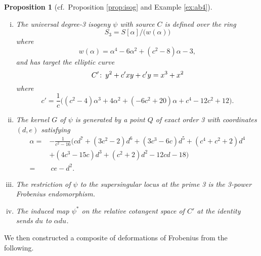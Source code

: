 \documentclass{gtpart}
\newtheorem{prop}[thm]{Proposition}
\theoremstyle{definition}
\theoremstyle{remark}
\def\co{\colon\thinspace}
\newcommand{\A}{\alpha}
\numberwithin{equation}{section}
\numberwithin{thm}{section}
\begin{document}
\begin{prop}[cf.~Proposition \ref{prop:isog} and Example \ref{ex:ab4}]
\label{prop:df}
 \mbox{}
 \begin{enumerate}[(i)]
  \item \label{df(i)} The universal degree-3 isogeny $\psi$ with source 
  $C$ is defined over the ring 
  \begin{equation}
  \label{S3}
   S_3 = S [\A] \big/ \big( w(\A) \big) 
  \end{equation}
  where 
  \[
   w(\A) = \A^4 - 6 \A^2 + (c^2 - 8) \A - 3, 
  \]
  and has target the elliptic curve 
  \begin{equation}
  \label{C'}
   C' \co y^2 + c' x y + c' y = x^3 + x^2 
  \end{equation}
  where 
  \[
   c' = \frac{1}{c} \big( (c^2 - 4) \A^3 + 4 \A^2 + (-6 c^2 + 20) \A 
   + c^4 - 12 c^2 + 12 \big).  
  \]

  \item The kernel $G$ of $\psi$ is generated by a point $Q$ of exact 
  order 3 with coordinates $(d,e)$ satisfying 
  \begin{equation}
  \label{A}
  \begin{split}
   \A = & -\frac{1}{c^2 - 16} \big( c d^7 + (3 c^2 - 2) d^6 + (3 c^3 - 6 c) d^5 + (c^4 + c^2 + 2) d^4 \\
        & + (4 c^3 - 15 c) d^3 + (c^2 + 2) d^2 - 12 c d - 18 \big) \\
      = & ~ c e - d^2.  
  \end{split}
  \end{equation}

  \item The restriction of $\psi$ to the supersingular locus at the 
  prime 3 is the 3-power Frobenius endomorphism.  

  \item The induced map $\psi^*$ on the relative cotangent space of $C'$ 
  at the identity sends $du$ to $\A du$.  
 \end{enumerate}
\end{prop}

We then constructed a composite of deformations of Frobenius from the 
following.  
\end{document}

